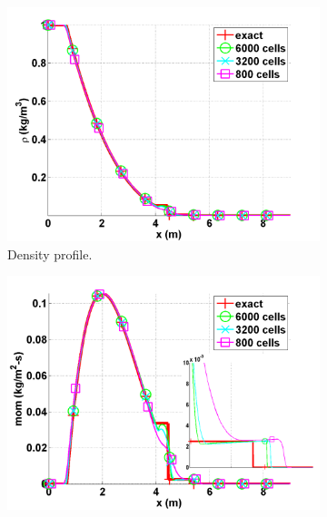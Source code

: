 \documentclass[preprint,10pt]{elsarticle}
\begin{document}
\begin{figure}[H]
        \centering
        \begin{subfigure}[b]{0.495\textwidth}
                \centering
                \includegraphics[width=\textwidth]{Leblanc_exact_and_numerical_stt_density_6000.png}
                \caption{Density profile.}
                \label{fig:1d_leblanc_vel}
        \end{subfigure}%
        \begin{subfigure}[b]{0.495\textwidth}
                \centering
                \includegraphics[width=\textwidth]{Leblanc_exact_and_numerical_stt_momentum_6000.png}

\end{subfigure}
\end{figure}
\end{document}

